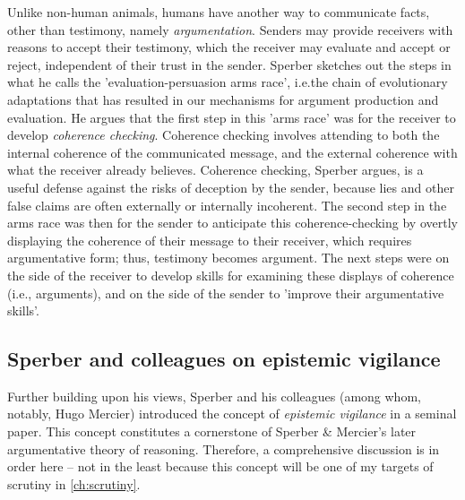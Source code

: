 Unlike non-human animals, humans have another way to communicate facts, other than testimony, namely \emph{argumentation}. Senders may provide receivers with reasons to accept their testimony, which the receiver may evaluate and accept or reject, independent of their trust in the sender.
Sperber sketches out the steps in what he calls the 'evaluation-persuasion arms race', i.e.\@ the chain of evolutionary adaptations that has resulted in our mechanisms for argument production and evaluation.
He argues that the first step in this 'arms race' was for the receiver to develop \emph{coherence checking}. Coherence checking involves attending to both the internal coherence of the communicated message, and the external coherence with what the receiver already believes. Coherence checking, Sperber argues, is a useful defense against the risks of deception by the sender, because lies and other false claims are often externally or internally incoherent.
The second step in the arms race was then for the sender to anticipate this coherence-checking by overtly displaying the coherence of their message to their receiver, which requires argumentative form; thus, testimony becomes argument. The next steps were on the side of the receiver to develop skills for examining these displays of coherence (i.e., arguments), and on the side of the sender to 'improve their argumentative skills'.

\subsection{Sperber and colleagues on epistemic vigilance}
\label{sec:Sperber10}

Further building upon his \citeyear{Sperber01} views, Sperber and his colleagues (among whom, notably, Hugo Mercier) introduced the concept of \emph{epistemic vigilance} in a seminal \citeyear{Sperber10} paper. This concept constitutes a cornerstone of Sperber \& Mercier's later argumentative theory of reasoning. Therefore, a comprehensive discussion is in order here -- not in the least because this concept will be one of my targets of scrutiny in \cref{ch:scrutiny}.

